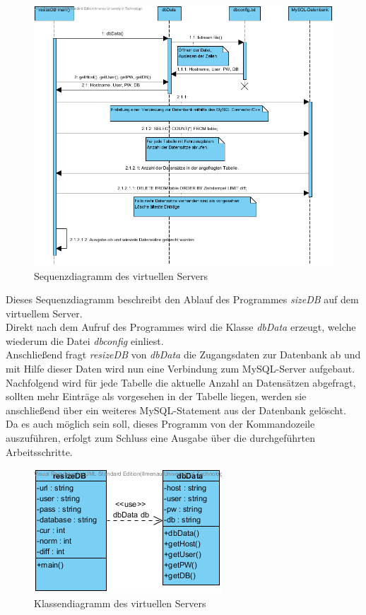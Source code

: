 \documentclass[fontsize = 12pt, paper = a4]{scrreprt}
\begin{document}
\begin{figure}[h]
\centering
\includegraphics[scale = 0.75]{resizeDBSequenz}
\caption[Sequenzdiagramm des virtuellen Servers]{Sequenzdiagramm des virtuellen Servers}
\label{resizeDBSequenz}
\end{figure} 

Dieses Sequenzdiagramm beschreibt den Ablauf des Programmes \textit{sizeDB} auf dem virtuellem Server.\\
Direkt nach dem Aufruf des Programmes wird die Klasse \textit{dbData} erzeugt, welche wiederum die Datei \textit{dbconfig} einliest. \\
Anschließend fragt \textit{resizeDB} von \textit{dbData} die Zugangsdaten zur Datenbank ab und mit Hilfe dieser Daten wird nun eine Verbindung zum MySQL-Server aufgebaut.\\
Nachfolgend wird für jede Tabelle die aktuelle Anzahl an Datensätzen abgefragt, sollten mehr Einträge als vorgesehen in der Tabelle liegen, werden sie anschließend über ein weiteres MySQL-Statement aus der Datenbank gelöscht.\\
Da es auch möglich sein soll, dieses Programm von der Kommandozeile auszuführen, erfolgt zum Schluss eine Ausgabe über die durchgeführten Arbeitsschritte.

\newpage

\begin{figure}[h]
\centering
\includegraphics[scale = 0.75]{resizeDB}
\caption[Klassendiagramm des virtuellen Servers]{Klassendiagramm des virtuellen Servers}
\label{resizeDB}
\end{figure}
\end{document}
